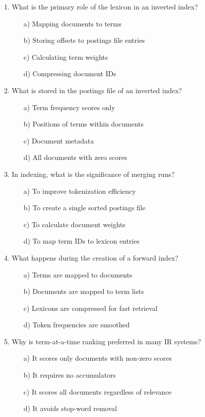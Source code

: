 \documentclass[8pt]{extarticle}
\begin{document}
\begin{multicols}{2}
\begin{enumerate}
\item What is the primary role of the lexicon in an inverted index?
\begin{itemize}
\item[a)] Mapping documents to terms
\item[b)] Storing offsets to postings file entries
\item[c)] Calculating term weights
\item[d)] Compressing document IDs
\end{itemize}

\item What is stored in the postings file of an inverted index?
\begin{itemize}
\item[a)] Term frequency scores only
\item[b)] Positions of terms within documents
\item[c)] Document metadata
\item[d)] All documents with zero scores
\end{itemize}

\item In indexing, what is the significance of merging runs?
\begin{itemize}
\item[a)] To improve tokenization efficiency
\item[b)] To create a single sorted postings file
\item[c)] To calculate document weights
\item[d)] To map term IDs to lexicon entries
\end{itemize}

\item What happens during the creation of a forward index?
\begin{itemize}
\item[a)] Terms are mapped to documents
\item[b)] Documents are mapped to term lists
\item[c)] Lexicons are compressed for fast retrieval
\item[d)] Token frequencies are smoothed
\end{itemize}

\item Why is term-at-a-time ranking preferred in many IR systems?
\begin{itemize}
\item[a)] It scores only documents with non-zero scores
\item[b)] It requires no accumulators
\item[c)] It scores all documents regardless of relevance
\item[d)] It avoids stop-word removal
\end{itemize}


\end{enumerate}
\end{multicols}
\end{document}
